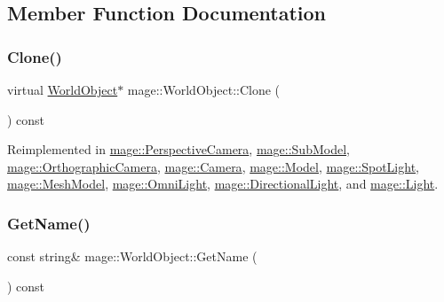 \subsection{Member Function Documentation}
\hypertarget{classmage_1_1_world_object_a8793d22cb63b1bd31b1307e5e7094f61}{}\label{classmage_1_1_world_object_a8793d22cb63b1bd31b1307e5e7094f61} 
\subsubsection{\texorpdfstring{Clone()}{Clone()}}
{\footnotesize\ttfamily virtual \hyperlink{classmage_1_1_world_object}{World\+Object}$\ast$ mage\+::\+World\+Object\+::\+Clone (\begin{DoxyParamCaption}{ }\end{DoxyParamCaption}) const\hspace{0.3cm}{\ttfamily [virtual]}}



Reimplemented in \hyperlink{classmage_1_1_perspective_camera_a08eebf7f3ba10a46b4b23c0ded1192f2}{mage\+::\+Perspective\+Camera}, \hyperlink{classmage_1_1_sub_model_a368bcc2ee819cc29ec0203e314ae91d3}{mage\+::\+Sub\+Model}, \hyperlink{classmage_1_1_orthographic_camera_ae075c08e4af88f74212bf5c84d2e5b2a}{mage\+::\+Orthographic\+Camera}, \hyperlink{classmage_1_1_camera_a19301c2256c183db50b5e9406f7b5f3c}{mage\+::\+Camera}, \hyperlink{classmage_1_1_model_ae5e9bee52da0db8c7a29920c13ed40ea}{mage\+::\+Model}, \hyperlink{classmage_1_1_spot_light_a3ec29a2a0edbd1f8fd7e76ba93d6c972}{mage\+::\+Spot\+Light}, \hyperlink{classmage_1_1_mesh_model_a7130eca9a1dac038c33b838c15138161}{mage\+::\+Mesh\+Model}, \hyperlink{classmage_1_1_omni_light_a43f53b59b022ca6ab2d8b7646e644e15}{mage\+::\+Omni\+Light}, \hyperlink{classmage_1_1_directional_light_a14e3816a550a992f1060de6da3b36dbf}{mage\+::\+Directional\+Light}, and \hyperlink{classmage_1_1_light_aada77583072dd108e5cf86257225b768}{mage\+::\+Light}.

\hypertarget{classmage_1_1_world_object_a3aab270d50a8d9ab1f9a970d3e04245f}{}\label{classmage_1_1_world_object_a3aab270d50a8d9ab1f9a970d3e04245f} 
\subsubsection{\texorpdfstring{Get\+Name()}{GetName()}}
{\footnotesize\ttfamily const string\& mage\+::\+World\+Object\+::\+Get\+Name (\begin{DoxyParamCaption}{ }\end{DoxyParamCaption}) const}

